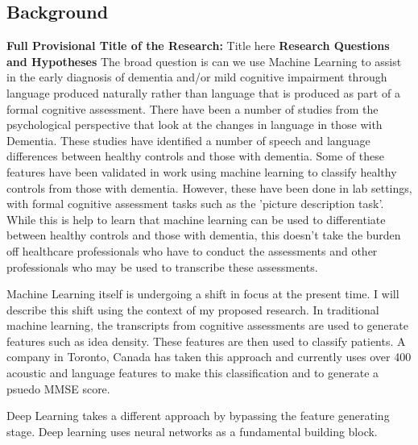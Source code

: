 \documentclass[12pt, twoside, a4paper]{article}
\begin{document}
\subsection{Background}
\textbf{Full Provisional Title of the Research:} Title here \newline
\textbf{Research Questions and Hypotheses}
The broad question is can we use Machine Learning to assist in the early diagnosis of dementia and/or mild cognitive impairment through language produced naturally rather than language that is produced as part of a formal cognitive assessment. There have been a number of studies from the psychological perspective that look at the changes in language in those with Dementia. These studies have identified a number of speech and language differences between healthy controls and those with dementia. Some of these features have been validated in work using machine learning to classify healthy controls from those with dementia. However, these have been done in lab settings, with formal cognitive assessment tasks such as the 'picture description task'. While this is help to learn that machine learning can be used to differentiate between healthy controls and those with dementia, this doesn't take the burden off healthcare professionals who have to conduct the assessments and other professionals who may be used to transcribe these assessments. \newline
\par
Machine Learning itself is undergoing a shift in focus at the present time. I will describe this shift using the context of my proposed research. In traditional machine learning, the transcripts from cognitive assessments are used to generate features such as idea density. These features are then used to classify patients. A company in Toronto, Canada has taken this approach and currently uses over 400 acoustic and language features to make this classification and to generate a psuedo MMSE score. \newline
\par
Deep Learning takes a different approach by bypassing the feature generating stage. Deep learning uses neural networks as a fundamental building block.
\end{document}
